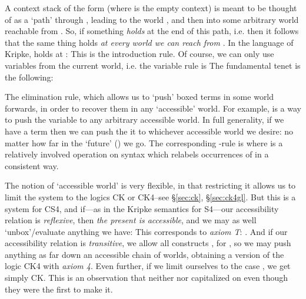 \documentclass[a4paper]{amsart}
\begin{document}
A context stack of the form  (where  is the empty context) is meant to be thought of
as a `path' through , leading to the world , and then
into some arbitrary world reachable from .  So, if
something \emph{holds} at the end of this path, i.e.  then it follows that the same thing holds \emph{at every world
we can reach from }. In the language of Kripke, 
holds at :  This is the introduction rule. Of course, we can only use
variables from the current world, i.e. the variable rule is  The fundamental tenet is the following: \begin{center}
\end{center} The elimination rule, which allows us to `push' boxed
terms in some world forwards, in order to recover them in any
`accessible' world. For example,  is a way to push the variable  to any
arbitrary accessible world.  In full generality, if we have a
term  then we can push
the it to whichever accessible world we desire:  no matter how far in the `future' ()
we go. The corresponding -rule is  where  is a relatively involved operation on syntax
which relabels occurrences of  in a consistent
way.

The notion of `accessible world' is very flexible, in that restricting
it allows us to limit the system to the logics \textsf{CK} or
\textsf{CK4}--see \S \ref{sec:ck}, \S \ref{sec:ck4gl}. But this is
a system for \textsf{CS4}, and if---as in the Kripke semantics for
\textsf{S4}---our accessibility relation is \emph{reflexive}, then
\emph{the present is accessible}, and we may as well
`unbox'/evaluate anything we have:  This corresponds to \emph{axiom T}: . And
if our accessibility relation is \emph{transitive}, we allow all
constructs , for , so we may
push anything as far down an accessible chain of worlds, obtaining
a version of the logic \textsf{CK4} with \emph{axiom 4}. Even
further, if we limit ourselves to the case , we get simply
\textsf{CK}.  This is an observation that neither
\cite{Pfenning1995} nor \cite{Davies2001a} capitalized on even
though they were the first to make it.
\end{document}
